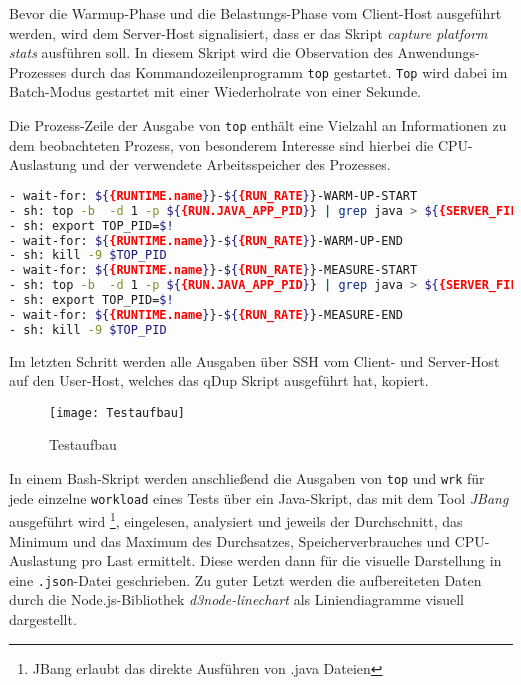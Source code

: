 Bevor die Warmup-Phase und die Belastungs-Phase vom Client-Host ausgeführt werden, wird dem Server-Host signalisiert, dass
er das Skript \textit{capture platform stats} ausführen soll.
In diesem Skript wird die Observation des Anwendungs-Prozesses durch das Kommandozeilenprogramm \verb|top| gestartet.
\verb|Top| wird dabei im Batch-Modus gestartet mit einer Wiederholrate von einer Sekunde.

Die Prozess-Zeile der Ausgabe von \verb|top| enthält eine Vielzahl an Informationen zu dem beobachteten Prozess, von besonderem
Interesse sind hierbei die CPU-Auslastung und der verwendete Arbeitsspeicher des Prozesses. \parencite{linuxTopManual}

\begin{lstlisting}[language=sh, caption=Auszug des qDup Skripts capture-platform-stats, captionpos=b]
- wait-for: ${{RUNTIME.name}}-${{RUN_RATE}}-WARM-UP-START
- sh: top -b  -d 1 -p ${{RUN.JAVA_APP_PID}} | grep java > ${{SERVER_FILE_PATH}}/output/${{RUNTIME.name}}-${{RUN_RATE}}-WARM-UP-top.out &
- sh: export TOP_PID=$!
- wait-for: ${{RUNTIME.name}}-${{RUN_RATE}}-WARM-UP-END
- sh: kill -9 $TOP_PID
- wait-for: ${{RUNTIME.name}}-${{RUN_RATE}}-MEASURE-START
- sh: top -b  -d 1 -p ${{RUN.JAVA_APP_PID}} | grep java > ${{SERVER_FILE_PATH}}/output/${{RUNTIME.name}}-${{RUN_RATE}}-MEASURE-top.out &
- sh: export TOP_PID=$!
- wait-for: ${{RUNTIME.name}}-${{RUN_RATE}}-MEASURE-END
- sh: kill -9 $TOP_PID
  \end{lstlisting}

Im letzten Schritt werden alle Ausgaben über SSH vom Client- und Server-Host auf den User-Host, welches das qDup Skript ausgeführt hat, kopiert.

\begin{figure}[ht]
  \centering
  \texttt{[image: Testaufbau]}
  \caption{Testaufbau}
\end{figure}

In einem Bash-Skript werden anschließend die Ausgaben von \verb|top| und \verb|wrk| für jede einzelne \verb|workload| eines Tests
über ein Java-Skript, das mit dem Tool \textit{JBang} ausgeführt wird \footnote{JBang erlaubt das direkte Ausführen von .java Dateien},
eingelesen, analysiert und jeweils der Durchschnitt, das Minimum und das Maximum des Durchsatzes, Speicherverbrauches und CPU-Auslastung pro Last ermittelt.
Diese werden dann für die visuelle Darstellung in eine \verb|.json|-Datei geschrieben.
Zu guter Letzt werden die aufbereiteten Daten durch die Node.js-Bibliothek \textit{d3node-linechart} als Liniendiagramme visuell dargestellt.

